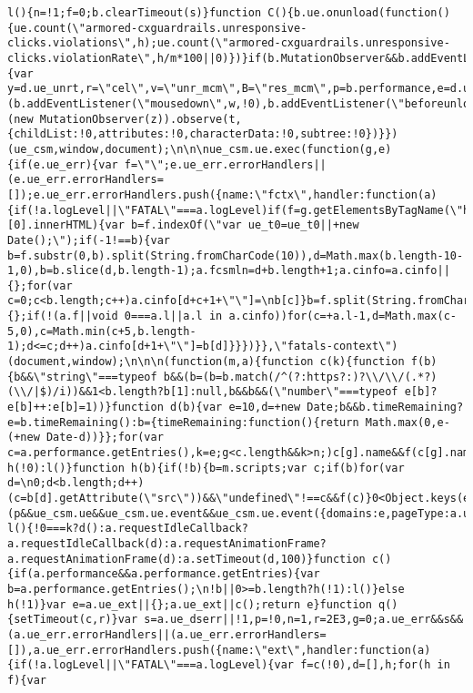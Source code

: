 \documentclass[
]{article}
\begin{document}
\begin{verbatim}
l(){n=!1;f=0;b.clearTimeout(s)}function C(){b.ue.onunload(function(){ue.count(\"armored-cxguardrails.unresponsive-clicks.violations\",h);ue.count(\"armored-cxguardrails.unresponsive-clicks.violationRate\",h/m*100||0)})}if(b.MutationObserver&&b.addEventListener&&Object.keys&&\nd&&d.ue&&d.ue.log&&d.ue_unrt&&d.ue_utils){var y=d.ue_unrt,r=\"cel\",v=\"unr_mcm\",B=\"res_mcm\",p=b.performance,e=d.ue_utils,n=!1,f=0,s=0,q=!1,k=0,h=0,m=0;b.addEventListener&&(b.addEventListener(\"mousedown\",w,!0),b.addEventListener(\"beforeunload\",l,!0),b.addEventListener(\"visibilitychange\",l,!0),b.addEventListener(\"pagehide\",l,!0));b.ue&&b.ue.event&&b.ue.onSushiUnload&&b.ue.onunload&&C();(new MutationObserver(z)).observe(t,{childList:!0,attributes:!0,characterData:!0,subtree:!0})}})(ue_csm,window,document);\n\n\nue_csm.ue.exec(function(g,e){if(e.ue_err){var f=\"\";e.ue_err.errorHandlers||(e.ue_err.errorHandlers=[]);e.ue_err.errorHandlers.push({name:\"fctx\",handler:function(a){if(!a.logLevel||\"FATAL\"===a.logLevel)if(f=g.getElementsByTagName(\"html\")[0].innerHTML){var b=f.indexOf(\"var ue_t0=ue_t0||+new Date();\");if(-1!==b){var b=f.substr(0,b).split(String.fromCharCode(10)),d=Math.max(b.length-10-1,0),b=b.slice(d,b.length-1);a.fcsmln=d+b.length+1;a.cinfo=a.cinfo||{};for(var c=0;c<b.length;c++)a.cinfo[d+c+1+\"\"]=\nb[c]}b=f.split(String.fromCharCode(10));a.cinfo=a.cinfo||{};if(!(a.f||void 0===a.l||a.l in a.cinfo))for(c=+a.l-1,d=Math.max(c-5,0),c=Math.min(c+5,b.length-1);d<=c;d++)a.cinfo[d+1+\"\"]=b[d]}}})}},\"fatals-context\")(document,window);\n\n\n(function(m,a){function c(k){function f(b){b&&\"string\"===typeof b&&(b=(b=b.match(/^(?:https?:)?\\/\\/(.*?)(\\/|$)/i))&&1<b.length?b[1]:null,b&&b&&(\"number\"===typeof e[b]?e[b]++:e[b]=1))}function d(b){var e=10,d=+new Date;b&&b.timeRemaining?e=b.timeRemaining():b={timeRemaining:function(){return Math.max(0,e-(+new Date-d))}};for(var c=a.performance.getEntries(),k=e;g<c.length&&k>n;)c[g].name&&f(c[g].name),g++,k=b.timeRemaining();g>=c.length?h(!0):l()}function h(b){if(!b){b=m.scripts;var c;if(b)for(var d=\n0;d<b.length;d++)(c=b[d].getAttribute(\"src\"))&&\"undefined\"!==c&&f(c)}0<Object.keys(e).length&&(p&&ue_csm.ue&&ue_csm.ue.event&&ue_csm.ue.event({domains:e,pageType:a.ue_pty||null,subPageType:a.ue_spty||null,pageTypeId:a.ue_pti||null},\"csm\",\"csm.CrossOriginDomains.2\"),a.ue_ext=e)}function l(){!0===k?d():a.requestIdleCallback?a.requestIdleCallback(d):a.requestAnimationFrame?a.requestAnimationFrame(d):a.setTimeout(d,100)}function c(){if(a.performance&&a.performance.getEntries){var b=a.performance.getEntries();\n!b||0>=b.length?h(!1):l()}else h(!1)}var e=a.ue_ext||{};a.ue_ext||c();return e}function q(){setTimeout(c,r)}var s=a.ue_dserr||!1,p=!0,n=1,r=2E3,g=0;a.ue_err&&s&&(a.ue_err.errorHandlers||(a.ue_err.errorHandlers=[]),a.ue_err.errorHandlers.push({name:\"ext\",handler:function(a){if(!a.logLevel||\"FATAL\"===a.logLevel){var f=c(!0),d=[],h;for(h in f){var 
\end{verbatim}
\end{document}

